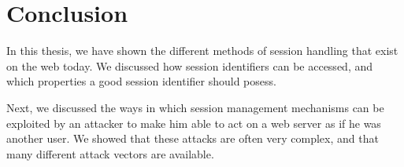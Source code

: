 \chapter{Conclusion}%

In this thesis, we have shown the different methods of session handling that exist on the web today. We discussed how session identifiers can be accessed, and which properties a good session identifier should posess.

Next, we discussed the ways in which session management mechanisms can be exploited by an attacker to make him able to act on a web server as if he was another user. We showed that these attacks are often very complex, and that many different attack vectors are available.

